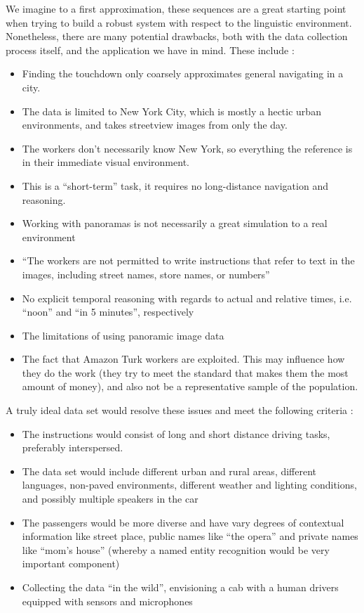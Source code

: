 \documentclass[a4paper, 11pt]{article}
\begin{document}
We imagine to a first approximation, these sequences are a great starting point
when trying to build a robust system with respect to the linguistic environment.
Nonetheless, there are many potential drawbacks, both with the data collection
process itself, and the application we have in mind. These include :

\begin{itemize}
\item Finding the touchdown only coarsely approximates general navigating in a city.
\item The data is limited to New York City, which is mostly a hectic urban environments,
  and takes streetview images from only the day.
\item The workers don't necessarily know New York, so everything the reference is in their immediate
  visual environment.
\item This is a ``short-term'' task, it requires no long-distance navigation
  and reasoning. 
\item Working with panoramas is not necessarily a great simulation to a real environment
\item ``The workers are not permitted to write instructions that refer to text in the
images, including street names, store names, or numbers''  \cite{chen2019touchdown}
\item No explicit temporal reasoning with regards to actual and relative times,
  i.e. ``noon'' and ``in 5 minutes'', respectively
\item The limitations of using panoramic image data
\item The fact that Amazon Turk workers are exploited. This may influence how they
  do the work (they try to meet the standard that makes them the most amount of
  money), and also not be a representative sample of the population.
\end{itemize}

A truly ideal data set would resolve these issues and meet the following
criteria :

\begin{itemize}
\item The instructions would consist of long and short distance driving tasks,
  preferably interspersed.
\item The data set would include different urban and rural areas, different
  languages, non-paved environments, different weather and lighting conditions, and possibly multiple speakers in the car
\item The passengers would be more diverse and have vary degrees of contextual
  information like street place, public names like ``the opera'' and 
  private names like ``mom's house'' (whereby a named entity recognition would
  be very important component)
\item Collecting the data ``in the wild'', envisioning a cab with a human
  drivers equipped with sensors and microphones
\end{itemize}
\end{document}
